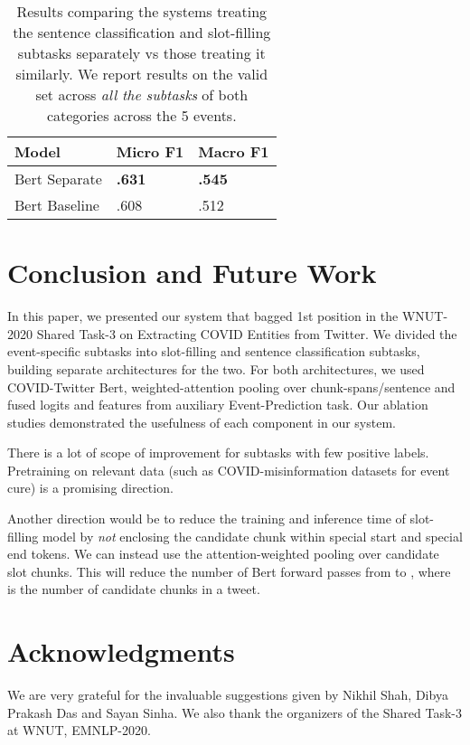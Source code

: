 \documentclass[11pt,a4paper]{article}
\begin{document}
\begin{table}
 \begin{center}
  \begin{tabular}{p{3cm}p{1.5cm}p{1.5cm}}
    \hline
    Model & Micro F1 & Macro F1\\ 
    \hline
    Bert Separate & \textbf{.631} & \textbf{.545}\\
    Bert Baseline & .608 & .512\\
    \hline

  \end{tabular}
  \caption{\label{Table6:} Results comparing the systems treating the sentence classification and slot-filling subtasks separately vs those treating it similarly. We report results on the valid set across \textit{all the subtasks} of both categories across the 5 events.}
 \end{center}
\end{table}

\section{Conclusion and Future Work}

In this paper, we presented our system that bagged 1st position in the WNUT-2020 Shared Task-3 on Extracting COVID Entities from Twitter. We divided the event-specific subtasks into slot-filling and sentence classification subtasks, building separate architectures for the two. For both architectures, we used COVID-Twitter Bert, weighted-attention pooling over chunk-spans/sentence and fused logits and features from auxiliary Event-Prediction task. Our ablation studies demonstrated the usefulness of each component in our system.

There is a lot of scope of improvement for subtasks with few positive labels. Pretraining on relevant data (such as COVID-misinformation datasets for event cure) is a promising direction.

Another direction would be to reduce the training and inference time of slot-filling model by \textit{not} enclosing the candidate chunk within special start  and special end  tokens. We can instead use the attention-weighted pooling over candidate slot chunks. This will reduce the number of Bert forward passes from  to , where  is the number of candidate chunks in a tweet.

\section*{Acknowledgments}

We are very grateful for the invaluable suggestions given by Nikhil Shah, Dibya Prakash Das and Sayan Sinha. We also thank the organizers of the Shared Task-3 at WNUT, EMNLP-2020.



\end{document}
